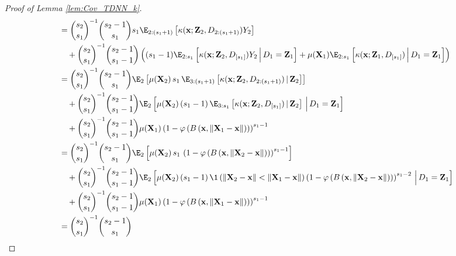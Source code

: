 \begin{proof}[Proof of Lemma \ref{lem:Cov_TDNN_k}]
\begin{equation}
\begin{aligned}
			 & = \binom{s_2}{s_1}^{-1}\binom{s_2 - 1}{s_1} s_1 \E_{2:(s_1 + 1)}\left[\kappa(\mathbf{x}; \mathbf{Z}_2, D_{2:(s_1 + 1)}) Y_2\right]                                       \\
			 & \quad + \binom{s_2}{s_1}^{-1}\binom{s_2 - 1}{s_1 - 1}\left(
			(s_1 - 1)\E_{2:s_1}\left[\kappa(\mathbf{x}; \mathbf{Z}_2, D_{[s_1]}) Y_2\, \Big| \, D_1 = \mathbf{Z}_1\right]
			+ \mu(\mathbf{X}_1)\E_{2:s_1}\left[\kappa(\mathbf{x}; \mathbf{Z}_1, D_{[s_1]})\, \Big| \, D_1 = \mathbf{Z}_1\right]
			\right)                                                                                                                                                                     \\
			 & = \binom{s_2}{s_1}^{-1}\binom{s_2 - 1}{s_1}
			\E_{2}\left[\mu(\mathbf{X}_2) \, s_1 \, \E_{3:(s_1+1)}\left[\kappa(\mathbf{x}; \mathbf{Z}_2, D_{2:(s_1 + 1)}) \, | \, \mathbf{Z}_2\right]\right]                            \\
			 & \quad + \binom{s_2}{s_1}^{-1}\binom{s_2 - 1}{s_1 - 1}
			\E_{2}\left[\mu(\mathbf{X}_2) \, (s_1 - 1) \, \E_{3:s_1}\left[\kappa(\mathbf{x}; \mathbf{Z}_2, D_{[s_1]}) \, | \, \mathbf{Z}_2\right] \, \Big| \, D_1 = \mathbf{Z}_1\right] \\
			 & \quad + \binom{s_2}{s_1}^{-1}\binom{s_2 - 1}{s_1 - 1}\mu(\mathbf{X}_1)
			\left(1 - \varphi\left(B\left(\mathbf{x}, \| \mathbf{X}_1 - \mathbf{x} \|\right)\right)\right)^{s_1 - 1}                                                                    \\
			 & = \binom{s_2}{s_1}^{-1}\binom{s_2 - 1}{s_1}
			\E_{2}\left[\mu(\mathbf{X}_2) \, s_1 \, \left(1 - \varphi\left(B\left(\mathbf{x}, \| \mathbf{X}_2 - \mathbf{x} \|\right)\right)\right)^{s_1 - 1}\right]                     \\
			 & \quad + \binom{s_2}{s_1}^{-1}\binom{s_2 - 1}{s_1 - 1}
			\E_{2}\left[\mu(\mathbf{X}_2) \, (s_1 - 1) \,
				\1\left(\|\mathbf{X}_2 - \mathbf{x}\| < \|\mathbf{X}_1 - \mathbf{x}\|\right)
			\left(1 - \varphi\left(B\left(\mathbf{x}, \| \mathbf{X}_2 - \mathbf{x} \|\right)\right)\right)^{s_1 - 2} \, \Big| \, D_1 = \mathbf{Z}_1\right]                              \\
			 & \quad + \binom{s_2}{s_1}^{-1}\binom{s_2 - 1}{s_1 - 1}\mu(\mathbf{X}_1)
			\left(1 - \varphi\left(B\left(\mathbf{x}, \| \mathbf{X}_1 - \mathbf{x} \|\right)\right)\right)^{s_1 - 1}                                                                    \\
			 & = \binom{s_2}{s_1}^{-1}\binom{s_2 - 1}{s_1}

\end{aligned}
\end{equation}
\end{proof}
